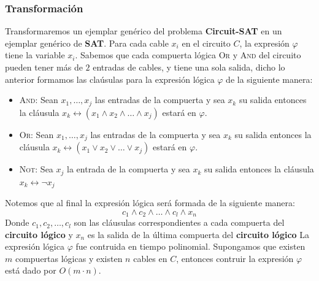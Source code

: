 \documentclass[a4paper]{article}
\begin{document}
\subsubsection{Transformación}
\noindent
Transformaremos un ejemplar genérico del problema \textbf{Circuit-SAT} en un ejemplar genérico de \textbf{SAT}.
\newline 
Para cada cable \(x_{i}\) en el circuito \(C\), la expresión \(\varphi\) tiene la variable \(x_{i}\). 
\newline 
Sabemos que cada compuerta lógica \textsc{Or} y \textsc{And} del circuito pueden tener más de \(2\) entradas de cables, y tiene una sola salida, dicho 
lo anterior formamos las claúsulas para la expresión lógica \(\varphi\) de la siguiente manera:
\begin{itemize}
    \item \textsc{And}: Sean \(x_{1}, \dotsc, x_{j}\) las entradas de la compuerta y sea \(x_{k}\) su salida entonces la cláusula \(x_{k} \longleftrightarrow \left(x_{1} \land x_{2} \land \dotsc \land x_{j}\right) \) estará en \(\varphi\).
    \item \textsc{Or}: Sean \(x_{1}, \dotsc, x_{j}\) las entradas de la compuerta y sea \(x_{k}\) su salida entonces la cláusula \(x_{k} \longleftrightarrow \left(x_{1} \lor x_{2} \lor \dotsc \lor x_{j}\right)\) estará en \(\varphi\).
    \item \textsc{Not}: Sea \(x_{j}\) la entrada de la compuerta y sea \(x_{k}\) su salida entonces la cláusula \(x_{k} \longleftrightarrow \neg x_{j} \)
\end{itemize}
Notemos que al final la expresión lógica será formada de la siguiente manera:
\[
    c_{1} \land c_{2} \land \dotsc \land c_{l} \land x_{n}
\]
Donde \(c_{1}, c_{2}, \dotsc, c_{l}\) son las cláusulas correspondientes a cada compuerta del \textbf{circuito lógico} y \(x_{n}\) es la salida de la última compuerta del 
\textbf{circuito lógico}
\newline 
La expresión lógica \(\varphi\) fue contruida en tiempo polinomial.
\newline 
Supongamos que existen \(m\) compuertas lógicas y existen \(n\) cables en \(C\), entonces contruir la expresión \(\varphi\) está dado por \(O\left(m \cdot n\right)\).
\end{document}
